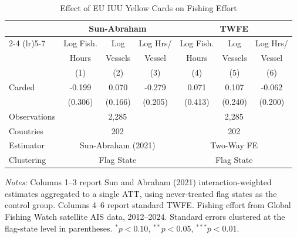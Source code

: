 \begin{table}[t]
\centering
\caption{Effect of EU IUU Yellow Cards on Fishing Effort}
\label{tab:main}
\begin{threeparttable}
\begin{tabular}{lcccccc}
\toprule
 & \multicolumn{3}{c}{Sun-Abraham} & \multicolumn{3}{c}{TWFE} \\
\cmidrule(lr){2-4} \cmidrule(lr){5-7}
 & Log Fish. & Log & Log Hrs/ & Log Fish. & Log & Log Hrs/ \\
 & Hours & Vessels & Vessel & Hours & Vessels & Vessel \\
 & (1) & (2) & (3) & (4) & (5) & (6) \\
\midrule
Carded & -0.199 & 0.070 & -0.279 & 0.071 & 0.107 & -0.062 \\
 & (0.306) & (0.166) & (0.205) & (0.413) & (0.240) & (0.200) \\
\midrule
Observations & \multicolumn{3}{c}{2,285} & \multicolumn{3}{c}{2,285} \\
Countries & \multicolumn{3}{c}{202} & \multicolumn{3}{c}{202} \\
Estimator & \multicolumn{3}{c}{Sun-Abraham (2021)} & \multicolumn{3}{c}{Two-Way FE} \\
Clustering & \multicolumn{3}{c}{Flag State} & \multicolumn{3}{c}{Flag State} \\
\bottomrule
\end{tabular}
\begin{tablenotes}[flushleft]
\small
\item \textit{Notes:} Columns 1--3 report Sun and Abraham (2021) interaction-weighted estimates aggregated to a single ATT, using never-treated flag states as the control group. Columns 4--6 report standard TWFE. Fishing effort from Global Fishing Watch satellite AIS data, 2012--2024. Standard errors clustered at the flag-state level in parentheses. $^{*}p<0.10$, $^{**}p<0.05$, $^{***}p<0.01$.
\end{tablenotes}
\end{threeparttable}
\end{table}
